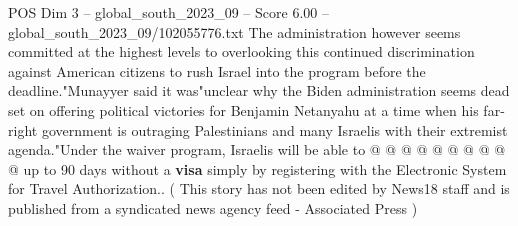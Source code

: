\begin{textsample}{POS Dim 3 – global\_south\_2023\_09 – Score 6.00 – global\_south\_2023\_09/102055776.txt}
The administration however seems committed at the highest levels to overlooking this continued discrimination against American citizens to rush Israel into the program before the deadline."Munayyer said it was"unclear why the Biden administration seems dead set on offering political victories for Benjamin Netanyahu at a time when his far-right government is outraging Palestinians and many Israelis with their extremist agenda."Under the waiver program, Israelis will be able to @ @ @ @ @ @ @ @ @ @ up to 90 days without a \textbf{visa} simply by registering with the Electronic System for Travel Authorization.. ( This story has not been edited by News18 staff and is published from a syndicated news agency feed - Associated Press )

\end{textsample}
